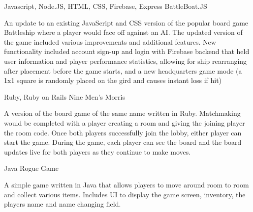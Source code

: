 


\begin{cventries}


\cventry
{Javascript, Node.JS, HTML, CSS, Firebase, Express} %
{BattleBoat.JS} %
{}
{}
{ %
\begin{cvitems}
\item {An update to an existing JavaScript and CSS version of the popular board game Battleship where a player would face off against an AI. The updated version of the game included various improvements and additional features. New functionality included account sign-up and login with Firebase backend that held user information and player performance statistics, allowing for ship rearranging after placement before the game starts, and a new headquarters game mode (a 1x1 square is randomly placed on the gird and causes instant loss if hit)}
\end{cvitems}
}


\cventry
{Ruby, Ruby on Rails} %
{Nine Men's Morris} %
{}
{}
{ %
\begin{cvitems}
\item {A version of the board game of the same name written in Ruby. Matchmaking would be completed with a player creating a room and giving the joining player the room code. Once both players successfully join the lobby, either player can start the game. During the game, each player can see the board and the board updates live for both players as they continue to make moves.}
\end{cvitems}
}

\cventry
{Java} %
{Rogue Game} %
{}
{}
{ %
\begin{cvitems}
\item {A simple game written in Java that allows players to move around room to room and collect various items. Includes UI to display the game screen, inventory, the players name and name changing field.}
\end{cvitems}
}


\end{cventries}